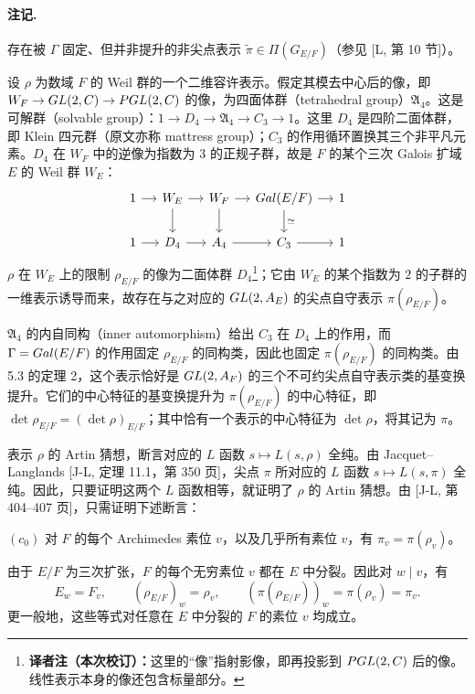 \paragraph*{注记.}
存在被 $\Gamma$ 固定、但并非提升的非尖点表示 $\widetilde\pi\in\Pi(G_{E/F})$（参见 [L, 第 10 节]）。

设 $\rho$ 为数域 $F$ 的 Weil 群的一个二维容许表示。假定其模去中心后的像，即 $W_F\to GL(2,C)\to PGL(2,C)$ 的像，为四面体群（tetrahedral group）$\mathfrak A_4$。这是可解群（solvable group）：$1\to D_4\to\mathfrak A_4\to C_3\to1$。这里 $D_4$ 是四阶二面体群，即 Klein 四元群（原文亦称 mattress group）；$C_3$ 的作用循环置换其三个非平凡元素。$D_4$ 在 $W_F$ 中的逆像为指数为 $3$ 的正规子群，故是 $F$ 的某个三次 Galois 扩域 $E$ 的 Weil 群 $W_E$：
\[
 \begin{tikzcd}[column sep=small]
 1\arrow[r]&W_E\arrow[r]\arrow[d]&W_F\arrow[r]\arrow[d]&\Gal(E/F)\arrow[r]\arrow[d,"\simeq"]&1\\
 1\arrow[r]&D_4\arrow[r]&\mathfrak A_4\arrow[r]&C_3\arrow[r]&1
 \end{tikzcd}
\]
$\rho$ 在 $W_E$ 上的限制 $\rho_{E/F}$ 的像为二面体群 $D_4$\footnote{\textbf{译者注（本次校订）：}这里的“像”指射影像，即再投影到 $PGL(2,C)$ 后的像。线性表示本身的像还包含标量部分。}；它由 $W_E$ 的某个指数为 $2$ 的子群的一维表示诱导而来，故存在与之对应的 $GL(2,A_E)$ 的尖点自守表示 $\pi(\rho_{E/F})$。

$\mathfrak A_4$ 的内自同构（inner automorphism）给出 $C_3$ 在 $D_4$ 上的作用，而 $\Gamma=Gal(E/F)$ 的作用固定 $\rho_{E/F}$ 的同构类，因此也固定 $\pi(\rho_{E/F})$ 的同构类。由 5.3 的定理 2，这个表示恰好是 $GL(2,A_F)$ 的三个不可约尖点自守表示类的基变换提升。它们的中心特征的基变换提升为 $\pi(\rho_{E/F})$ 的中心特征，即 $\det\rho_{E/F}=(\det\rho)_{E/F}$；其中恰有一个表示的中心特征为 $\det\rho$，将其记为 $\pi$。

表示 $\rho$ 的 Artin 猜想，断言对应的 $L$ 函数 $s\mapsto L(s,\rho)$ 全纯。由 Jacquet--Langlands [J-L, 定理 11.1，第 350 页]，尖点 $\pi$ 所对应的 $L$ 函数 $s\mapsto L(s,\pi)$ 全纯。因此，只要证明这两个 $L$ 函数相等，就证明了 $\rho$ 的 Artin 猜想。由 [J-L, 第 404--407 页]，只需证明下述断言：

$(c_0)$ 对 $F$ 的每个 Archimedes 素位 $v$，以及几乎所有素位 $v$，有 $\pi_v=\pi(\rho_v)$。

由于 $E/F$ 为三次扩张，$F$ 的每个无穷素位 $v$ 都在 $E$ 中分裂。因此对 $w\mid v$，有
\[
 E_w=F_v,\qquad(\rho_{E/F})_w=\rho_v,\qquad
 (\pi(\rho_{E/F}))_w=\pi(\rho_v)=\pi_v.
\]
更一般地，这些等式对任意在 $E$ 中分裂的 $F$ 的素位 $v$ 均成立。

